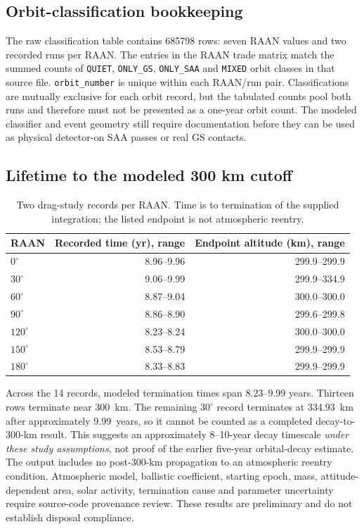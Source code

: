 \subsection{Orbit-classification bookkeeping}
The raw classification table contains 685798 rows: seven RAAN values and two recorded runs per RAAN. The entries in the RAAN trade matrix match the summed counts of \texttt{QUIET}, \texttt{ONLY\_GS}, \texttt{ONLY\_SAA} and \texttt{MIXED} orbit classes in that source file. \texttt{orbit\_number} is unique within each RAAN/run pair. Classifications are mutually exclusive for each orbit record, but the tabulated counts pool both runs and therefore must not be presented as a one-year orbit count. The modeled classifier and event geometry still require documentation before they can be used as physical detector-on SAA passes or real GS contacts.

\subsection{Lifetime to the modeled 300 km cutoff}
\begin{table}[htbp]\centering\small
\caption{Two drag-study records per RAAN. Time is to termination of the supplied integration; the listed endpoint is not atmospheric reentry.}\label{tab:drag-updated}
\begin{tabular}{@{}lrr@{}}\toprule RAAN & Recorded time (yr), range & Endpoint altitude (km), range\\\midrule
$0^\circ$ & 8.96--9.96 & 299.9--299.9 \\
$30^\circ$ & 9.06--9.99 & 299.9--334.9 \\
$60^\circ$ & 8.87--9.04 & 300.0--300.0 \\
$90^\circ$ & 8.86--8.90 & 299.6--299.8 \\
$120^\circ$ & 8.23--8.24 & 300.0--300.0 \\
$150^\circ$ & 8.53--8.79 & 299.9--299.9 \\
$180^\circ$ & 8.33--8.83 & 299.9--299.9 \\
\bottomrule\end{tabular}\end{table}
Across the 14 records, modeled termination times span 8.23--9.99 years. Thirteen rows terminate near 300~km. The remaining $30^\circ$ record terminates at 334.93~km after approximately 9.99~years, so it cannot be counted as a completed decay-to-300-km result. This suggests an approximately 8--10-year decay timescale \emph{under these study assumptions}, not proof of the earlier five-year orbital-decay estimate. The output includes no post-300-km propagation to an atmospheric reentry condition. Atmospheric model, ballistic coefficient, starting epoch, mass, attitude-dependent area, solar activity, termination cause and parameter uncertainty require source-code provenance review. These results are preliminary and do not establish disposal compliance.

